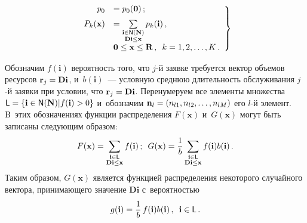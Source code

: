\begin{multicols}{2}
\noindent
\begin{equation}
\left.
\begin{array}{rl}
p_0 &= p_0(\mathbf{0})\,;\\[6pt] 
P_k(\mathbf{x}) &= \sum\limits_{\substack{{\mathbf{i}\in{\sf 
N}(\mathbf{N})}\\ {\mathbf{Di}\leq \mathbf{x}}}} p_k(\mathbf{i})\,,\\[6pt] 
&\mathbf{0}\leq\mathbf{x}\leq\mathbf{R}\,,\enskip k=1,2,\ldots ,K\,.
\end{array}
\right\}
\label{e16-n}
\end{equation}
  
  Обозначим $f(\mathbf{i})$ вероятность того, что $j$-й заявке требуется 
вектор объемов ресурсов $\mathbf{r}_j\hm= \mathbf{Di}$, и~$b(\mathbf{i})$~--- 
условную среднюю длительность обслуживания \mbox{$j$-й} заявки при условии, что 
$\mathbf{r}_j\hm= \mathbf{Di}$. Перенумеруем все элементы множества ${\sf 
L}\hm= \{ \mathbf{i}\in {\sf N}(\mathbf{N})\vert f(\mathbf{i})>0\}$ и~обозначим 
$\mathbf{n}_l \hm= (n_{l1}, n_{l2},\ldots ,n_{lM})$ его $l$-й элемент. B~этих 
обозначениях функции распределения $F(\mathbf{x})$ и~$G(\mathbf{x})$ 
могут быть записаны следующим образом:
  \begin{equation}
  F(\mathbf{x}) = \sum\limits_{\substack{{\mathbf{i}\in{\sf L}}\\ 
{\mathbf{Di}\leq \mathbf{x}}}} f(\mathbf{i})\,;\enskip
  G(\mathbf{x}) =\displaystyle\frac{\displaystyle 1\mathstrut}{\displaystyle b\mathstrut}\sum\limits_{\substack{{\mathbf{i}\in{\sf L}}\\ 
{\mathbf{Di}\leq \mathbf{x}}}} f(\mathbf{i}) b(\mathbf{i})\,.
  \label{e17-n}
 \end{equation}
Таким образом, $G(\mathbf{x})$ является функцией распределения некоторого 
случайного вектора, прини\-ма\-юще\-го значение $\mathbf{Di}$ с~вероятностью 
\begin{equation}
g(\mathbf{i}) = \displaystyle\frac{\displaystyle 1\mathstrut}{\displaystyle b\mathstrut}\,f(\mathbf{i})b(\mathbf{i})\,,\enskip \mathbf{i}\in{\sf 
L}\,.
\label{e18-n}
\end{equation}
  

\end{multicols}
